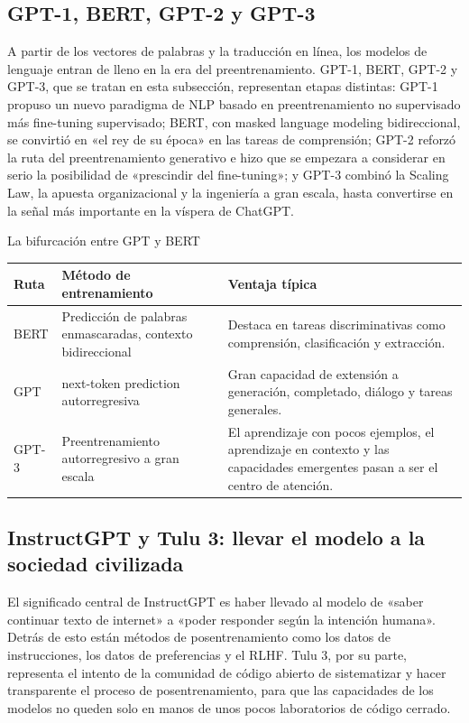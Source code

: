 \documentclass[a4paper]{article}
\begin{document}
\subsection{GPT-1, BERT, GPT-2 y GPT-3}

A partir de los vectores de palabras y la traducción en línea, los modelos de lenguaje entran de lleno en la era del preentrenamiento. GPT-1, BERT, GPT-2 y GPT-3, que se tratan en esta subsección, representan etapas distintas: GPT-1 propuso un nuevo paradigma de NLP basado en preentrenamiento no supervisado más fine-tuning supervisado; BERT, con masked language modeling bidireccional, se convirtió en «el rey de su época» en las tareas de comprensión; GPT-2 reforzó la ruta del preentrenamiento generativo e hizo que se empezara a considerar en serio la posibilidad de «prescindir del fine-tuning»; y GPT-3 combinó la Scaling Law, la apuesta organizacional y la ingeniería a gran escala, hasta convertirse en la señal más importante en la víspera de ChatGPT.

\begin{knowledgebox}{La bifurcación entre GPT y BERT}
\begin{tabularx}{\textwidth}{p{}p{}X}
\toprule
Ruta & Método de entrenamiento & Ventaja típica \\
\midrule
BERT & Predicción de palabras enmascaradas, contexto bidireccional & Destaca en tareas discriminativas como comprensión, clasificación y extracción. \\
GPT & next-token prediction autorregresiva & Gran capacidad de extensión a generación, completado, diálogo y tareas generales. \\
GPT-3 & Preentrenamiento autorregresivo a gran escala & El aprendizaje con pocos ejemplos, el aprendizaje en contexto y las capacidades emergentes pasan a ser el centro de atención. \\
\bottomrule
\end{tabularx}
\end{knowledgebox}

\subsection{InstructGPT y Tulu 3: llevar el modelo a la sociedad civilizada}

El significado central de InstructGPT es haber llevado al modelo de «saber continuar texto de internet» a «poder responder según la intención humana». Detrás de esto están métodos de posentrenamiento como los datos de instrucciones, los datos de preferencias y el RLHF. Tulu 3, por su parte, representa el intento de la comunidad de código abierto de sistematizar y hacer transparente el proceso de posentrenamiento, para que las capacidades de los modelos no queden solo en manos de unos pocos laboratorios de código cerrado.
\end{document}

